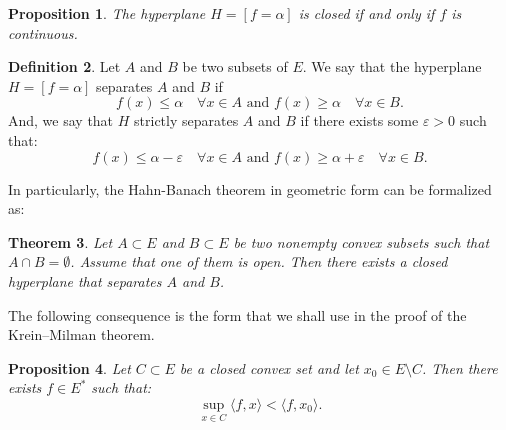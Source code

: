 \documentclass[reqno]{amsart}
\newtheorem{theorem}{Theorem}[section]
\newtheorem{proposition}[theorem]{Proposition}
\theoremstyle{definition}
\newtheorem{definition}[theorem]{Definition}
\newcommand{\ip}[2]{\langle #1, #2 \rangle}
\begin{document}
\begin{proposition}
    The hyperplane $H = [f = \alpha]$ is closed if and only if $f$ is continuous.
\end{proposition}

\begin{definition}
    Let $A$ and $B$ be two subsets of $E$. We say that the hyperplane $H = [f = \alpha]$ separates $A$ and $B$ if 
    \begin{equation}
        f(x) \leq \alpha\quad\forall x \in A \text{ and } f(x) \geq \alpha \quad\forall x \in B.
    \end{equation}
    And, we say that $H$ strictly separates $A$ and $B$ if there exists some $\varepsilon > 0$ such that:
    \begin{equation}
        f(x) \leq \alpha - \varepsilon\quad\forall x \in A \text{ and } f(x) \geq \alpha + \varepsilon\quad\forall x \in B.
    \end{equation}
\end{definition}

In particularly, the Hahn-Banach theorem in geometric form can be formalized as:
\begin{theorem}
    Let $A \subset E$ and $B \subset E$ be two nonempty convex subsets such that $A \cap B = \emptyset$. Assume that one of them is open. Then there exists a closed hyperplane that separates $A$ and $B$.
\end{theorem}

The following consequence is the form that we shall use in the proof of the Krein--Milman theorem.
\begin{proposition}\label{prop:strict-separation-point}
    Let $C \subset E$ be a closed convex set and let $x_0 \in E \setminus C$. Then there exists $f \in E^*$ such that:
    \begin{equation}
        \sup_{x \in C} \ip{f}{x} < \ip{f}{x_0}.
    \end{equation}
\end{proposition}
\end{document}
